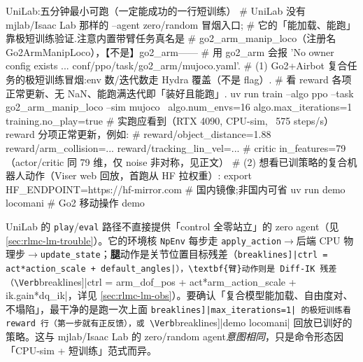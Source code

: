 \begin{codebox}[bash]{UniLab:五分钟最小可跑（一定能成功的一行短训练）}
# UniLab 没有 mjlab/Isaac Lab 那样的 --agent zero/random 冒烟入口;
# 它的「能加载、能跑」靠极短训练验证.注意内置带臂任务真名是
# go2_arm_manip_loco（注册名 Go2ArmManipLoco），【不是】go2_arm——
# 用 go2_arm 会报 'No owner config exists ... conf/ppo/task/go2_arm/mujoco.yaml'.
# (1) Go2+Airbot 复合任务的极短训练冒烟:env 数/迭代数走 Hydra 覆盖（不是 flag）.
#     看 reward 各项正常更新、无 NaN、能跑满迭代即「装好且能跑」.
uv run train --algo ppo --task go2_arm_manip_loco --sim mujoco \
    algo.num_envs=16 algo.max_iterations=1 training.no_play=true
# 实跑应看到（RTX 4090, CPU-sim, ~575 steps/s）reward 分项正常更新，例如:
#   reward/object_distance=1.88   reward/arm_collision=...   reward/tracking_lin_vel=...
#   critic in_features=79         （actor/critic 同 79 维，仅 noise 非对称，见正文）
# (2) 想看已训策略的复合机器人动作（Viser web 回放，首跑从 HF 拉权重）:
export HF_ENDPOINT=https://hf-mirror.com         # 国内镜像;非国内可省
uv run demo locomani                             # Go2 移动操作 demo
\end{codebox}

\begin{note}
UniLab 的 \verb|play|/\allowbreak\verb|eval| 路径不直接提供「control 全零站立」的 zero agent（见 \cref{sec:rlmc-lm-trouble}）。它的环境核 \verb|NpEnv| 每步走 \verb|apply_action|$\to$后端 CPU 物理步$\to$\verb|update_state|；\textbf{腿}动作是关节位置目标残差（\Verb[breaklines]|ctrl = act*action_scale + default_angles|），\textbf{臂}动作则是 Diff-IK 残差（\Verb[breaklines]|ctrl = arm_dof_pos + act*arm_action_scale + ik.gain*dq_ik|，详见 \cref{sec:rlmc-lm-obs}）。要确认「复合模型能加载、自由度对、不塌陷」，最干净的是跑一次上面 \Verb[breaklines]|max_iterations=1| 的极短训练看 reward 行（第一步就有正反馈），或 \Verb[breaklines]|demo locomani| 回放已训好的策略。这与 mjlab/Isaac Lab 的 zero/random agent\emph{意图相同}，只是命令形态因「CPU-sim + 短训练」范式而异。
\end{note}

